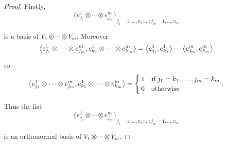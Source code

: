 \begin{proof}
    Firstly,
    \[
        {\{ e_{j_{1}}^{1}\otimes \cdots\otimes e_{j_{m}}^{m} \}}_{j_{1}=1,\ldots,n_{1}; \ldots ; j_{m}=1,\ldots,n_{m}}
    \]

    is a basis of $V_{1}\otimes\cdots\otimes V_{m}$. Moreover
    \begin{align*}
        \left\langle{e_{j_{1}}^{1}\otimes\cdots\otimes e_{j_{m}}^{m}, e_{k_{1}}^{1}\otimes\cdots\otimes e_{k_{m}}^{m}}\right\rangle = \left\langle{e_{j_{1}}^{1}, e_{k_{1}}^{1}}\right\rangle\cdots\left\langle{e_{j_{m}}^{m}, e_{k_{m}}^{m}}\right\rangle
    \end{align*}

    so
    \[
        \left\langle{e_{j_{1}}^{1}\otimes\cdots\otimes e_{j_{m}}^{m}, e_{k_{1}}^{1}\otimes\cdots\otimes e_{k_{m}}^{m}}\right\rangle =
        \begin{cases}
            1 & \text{if $j_{1} = k_{1}, \ldots, j_{m} = k_{m}$} \\
            0 & \text{otherwise}
        \end{cases}.
    \]

    Thus the list
    \[
        {\{ e_{j_{1}}^{1}\otimes \cdots\otimes e_{j_{m}}^{m} \}}_{j_{1}=1,\ldots,n_{1}; \ldots ; j_{m}=1,\ldots,n_{m}}
    \]

    is an orthonormal basis of $V_{1}\otimes\cdots\otimes V_{m}$.
\end{proof}
\newpage
